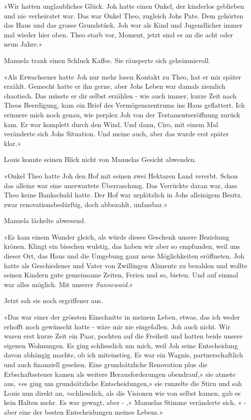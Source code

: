 «Wir hatten unglaubliches Glück. Joh hatte einen Onkel, der kinderlos
geblieben und nie verheiratet war. Das war Onkel Theo, zugleich Johs
Pate. Dem gehörten das Haus und das grosse Grundstück. Joh war als Kind
und Jugendlicher immer mal wieder hier oben. Theo starb vor, Moment, jetzt sind es an die
acht oder neun Jahre.»

Manuela trank einen Schluck Kaffee. Sie räusperte sich geheimnisvoll.

«Als Erwachsener hatte Joh nur mehr losen Kontakt zu Theo, hat er mir
später erzählt. Gemocht hatte er ihn gerne, aber Johs Leben war damals
ziemlich chaotisch. Das müsste er dir selbst erzählen - wie auch immer,
kurze Zeit nach Theos Beerdigung, kam ein Brief des Vermögenszentrums
ins Haus geflattert. Ich erinnere mich noch genau, wie perplex Joh von der Testamentseröffnung zurück kam.
Er war komplett durch den Wind. Und dann, Ciro, mit
einem Mal veränderte sich Johs Situation. Und meine auch, aber das wurde
erst später klar.»

Louis konnte seinen Blick nicht von Manuelas Gesicht abwenden.

«Onkel Theo hatte Joh den Hof mit seinen zwei Hektaren
Land vererbt. Schon das alleine war eine unerwartete Überraschung. Das Verrückte
daran war, dass Theo keine Bankschuld hatte. Der Hof war urplötzlich in
Johs alleinigem Besitz, zwar renovationsbedürftig, doch abbezahlt,
unfassbar.»

Manuela lächelte abwesend.

«Es kam einem Wunder gleich, als würde dieses Geschenk unsere Beziehung
krönen. Klingt ein bisschen wulstig, das haben wir aber so empfunden,
weil uns dieser Ort, das Haus und die Umgebung ganz neue Möglichkeiten 
eröffneten. Joh hatte als Geschiedener und Vater von Zwillingen Alimente
zu bezahlen und wollte seinen Kindern gute gemeinsame Zeiten, Ferien und
so, bieten. Und auf einmal war alles möglich. Mit unserer \emph{Sunnewaid}.»

Jetzt sah sie noch ergriffener aus.

«Das war einer der grössten Einschnitte in meinem Leben, etwas, das ich
weder erhofft noch gewünscht hatte - wäre mir nie eingefallen. Joh auch nicht. Wir waren erst kurze Zeit ein Paar, pochten
auf die Freiheit und hatten beide unsere eigenen Wohnungen. Es ging
schliesslich um mich, weil Joh seine Entscheidung davon abhängig machte,
ob ich miteinstieg. Es war ein Wagnis, partnerschaftlich und auch
finanziell gesehen. Eine grundsätzliche Renovation plus die
Erbschaftssteuer kamen als weitere Herausforderungen obendrauf,» sie atmete aus, «es ging um grundsätzliche Entscheidungen,» sie
runzelte die Stirn und sah Louis nun direkt an, «schliesslich, als die
Visionen wie von selbst kamen, gab es kein Halten mehr. Es war gewagt, aber - ,» 
Manuelas Stimme veränderte sich, « - aber eine der besten Entscheidungen meines Lebens.»

